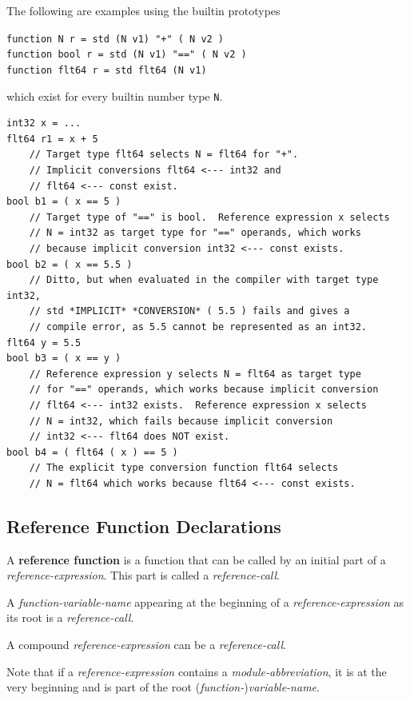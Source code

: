 \documentclass[12pt]{article}
\newcommand{\key}[1]{{\rm \bfseries #1}}
\newenvironment{indpar}[1][0.3in]%
	{\begin{list}{}%
		     {\setlength{\itemsep}{0in}%
		      \setlength{\topsep}{0in}%
		      \setlength{\parsep}{1ex}%
		      \setlength{\labelwidth}{#1}%
		      \setlength{\leftmargin}{#1}%
		      \addtolength{\leftmargin}{\labelsep}}%
	 \item}%
	{\end{list}}
\begin{document}
The following are examples using the builtin prototypes
\begin{indpar}
{\tt function N r = std (N v1) "+" ( N v2 )} \\
{\tt function bool r = std (N v1) "==" ( N v2 )} \\
{\tt function flt64 r = std flt64 (N v1)}
\end{indpar}
which exist for every builtin number type {\tt N}.
\begin{indpar}[1em]\begin{verbatim}
int32 x = ...
flt64 r1 = x + 5
    // Target type flt64 selects N = flt64 for "+".
    // Implicit conversions flt64 <--- int32 and
    // flt64 <--- const exist.
bool b1 = ( x == 5 )
    // Target type of "==" is bool.  Reference expression x selects
    // N = int32 as target type for "==" operands, which works
    // because implicit conversion int32 <--- const exists.
bool b2 = ( x == 5.5 )
    // Ditto, but when evaluated in the compiler with target type int32,
    // std *IMPLICIT* *CONVERSION* ( 5.5 ) fails and gives a
    // compile error, as 5.5 cannot be represented as an int32.
flt64 y = 5.5
bool b3 = ( x == y )
    // Reference expression y selects N = flt64 as target type
    // for "==" operands, which works because implicit conversion
    // flt64 <--- int32 exists.  Reference expression x selects
    // N = int32, which fails because implicit conversion
    // int32 <--- flt64 does NOT exist.
bool b4 = ( flt64 ( x ) == 5 )
    // The explicit type conversion function flt64 selects
    // N = flt64 which works because flt64 <--- const exists.
\end{verbatim}\end{indpar}

\subsection{Reference Function Declarations}
\label{REFERENCE-FUNCTION-DECLARATIONS}

A \key{reference function} is a function that can be
called by an initial part of a {\em reference-expression}.
This part is called a {\em reference-call}\label{REFERENCE-CALL}.


A {\em function-variable-name} appearing at the beginning of
a {\em reference-expression} as its root is a {\em reference-call}.

A compound {\em reference-expression} can be a {\em reference-call}.

Note that if a {\em reference-expression} contains a
{\em module-abbreviation}, it is at the very beginning and
is part of the root ({\em function-}){\em variable-name}.
\end{document}
